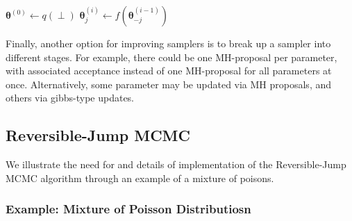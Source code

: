 \documentclass[twoside,12pt,bibstyle=chem-acs]{reedthesis}
\begin{document}
\begin{algorithm}
\begin{algorithmic}
\State $\bm\theta^{(0)} \gets q(\perp)$
		\State $\bm\theta^{(i)}_j \gets f(\bm\theta^{(i-1)}_{-j})$
	\EndFor
\EndFor
\end{algorithmic}
\caption{The Gibbs algorithm for model estimation}
\label{alg: gibbs}
\end{algorithm}

Finally, another option for improving samplers is to break up a sampler into different stages. For example, there could be one MH-proposal per parameter, with associated acceptance instead of one MH-proposal for all parameters at once. Alternatively, some parameter may be updated via MH proposals, and others via gibbs-type updates.

\subsection{Reversible-Jump MCMC} %
\label{sbsc: rjmcmc}

We illustrate the need for and details of implementation of the Reversible-Jump MCMC algorithm through an example of a mixture of poisons.
\subsubsection{Example: Mixture of Poisson Distributiosn}
\end{document}
